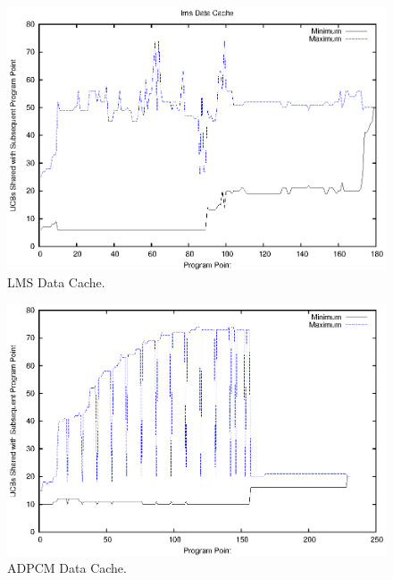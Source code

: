 \begin{figure}[h!]
\vspace{-10pt}
\begin{center}
\includegraphics[width=\linewidth]{eps/lms-dcache.eps}
\caption{LMS Data Cache.}
\label{fig:lms_data_cache}
\end{center}
\vspace{-10pt}
\end{figure}
\begin{figure}[h!]
\vspace{-10pt}
\begin{center}
\includegraphics[width=\linewidth]{eps/adpcm-dcache.eps}
\caption{ADPCM Data Cache.}
\label{fig:adpcm_data_cache}
\end{center}
\vspace{-20pt}
\end{figure}
